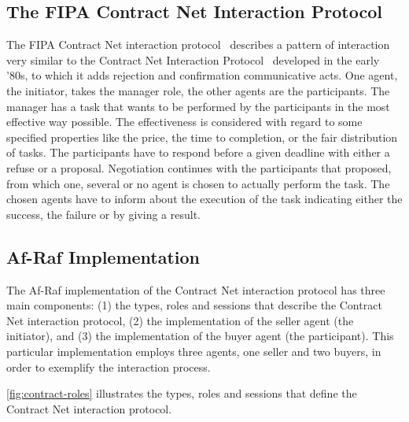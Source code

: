 \documentclass[a4paper,12pt,oneside,fleqn]{book} %
\begin{document}
\subsection{The FIPA Contract Net Interaction Protocol} %
The FIPA Contract Net interaction protocol~\cite{web:fipa} describes a
pattern of interaction very similar to the Contract Net Interaction
Protocol~\cite{DBLP:journals/tc/Smith80a} developed in the early
'80s, to which it adds rejection and confirmation communicative acts. One
agent, the initiator, takes the manager role, the other agents are the
participants. The manager has a task that wants to be performed by the
participants in the most effective way possible. The effectiveness is
considered with regard to some specified properties like the price, the
time to completion, or the fair distribution of tasks. The participants
have to respond before a given deadline with either a refuse or a proposal.
Negotiation continues with the participants that proposed, from which one,
several or no agent is chosen to actually perform the task. The chosen
agents have to inform about the execution of the task indicating either the
success, the failure or by giving a result.
\subsection{Af-Raf Implementation} %
The Af-Raf implementation of the Contract Net interaction protocol has
three main components: (1) the types, roles and sessions that describe the
Contract Net interaction protocol, (2) the implementation of the seller
agent (the initiator), and (3) the implementation of the buyer agent (the
participant). This particular implementation employs three agents, one
seller and two buyers, in order to exemplify the interaction process.

\autoref{fig:contract-roles} illustrates the types, roles and sessions that
define the Contract Net interaction protocol.
\end{document}
